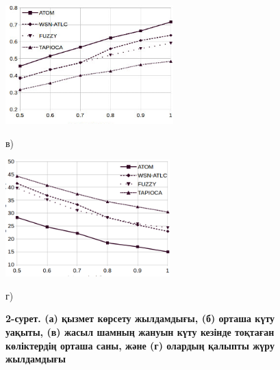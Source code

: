 \begin{figure}[H]
    \vspace{10pt} %

    \begin{minipage}{0.45\textwidth}
        \centering
        \includegraphics[width=\textwidth]{assets/159}
        \caption*{в)}
    \end{minipage}
    \hfill
    \begin{minipage}{0.45\textwidth}
        \centering
        \includegraphics[width=\textwidth]{assets/160}
        \caption*{г)}
    \end{minipage}

\caption*{\bfseries 2-сурет. (а) қызмет көрсету жылдамдығы, (б) орташа күту уақыты,
(в) жасыл шамның жануын күту кезінде тоқтаған көліктердің орташа саны,
және (г) олардың қалыпты жүру жылдамдығы}

\end{figure}



